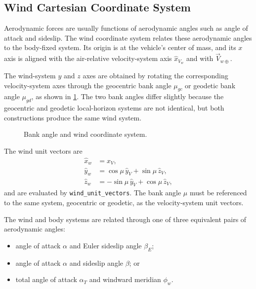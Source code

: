 \subsection{Wind Cartesian Coordinate System}\label{sec:wind-coordinate}

Aerodynamic forces are usually functions of aerodynamic angles such as angle of
attack and sideslip. The wind coordinate system relates these aerodynamic angles to
the body-fixed system. Its origin is at the vehicle's center of mass, and its $x$ axis
is aligned with the air-relative velocity-system axis $\hat x_{V_w}$ and with
$\vec V_{w\oplus}$.

The wind-system $y$ and $z$ axes are obtained by rotating the corresponding
velocity-system axes through the geocentric bank angle $\mu_{gc}$ or geodetic bank
angle $\mu_{gd}$, as shown in \cref{fig:bank-angle-wind-system}. The two bank
angles differ slightly because the geocentric and geodetic local-horizon systems are
not identical, but both constructions produce the same wind system.

\begin{figure}[htbp]
  \centering
  \resizebox{0.76\linewidth}{!}{}
  \caption{Bank angle and wind coordinate system.}
  \label{fig:bank-angle-wind-system}
\end{figure}

The wind unit vectors are
\begin{equation}
  \begin{aligned}
    \hat x_w &= \hat x_V,\\
    \hat y_w &= \cos\mu\,\hat y_V+\sin\mu\,\hat z_V,\\
    \hat z_w &= -\sin\mu\,\hat y_V+\cos\mu\,\hat z_V,
  \end{aligned}
  \label{eq:wind-unit-vectors}
\end{equation}
and are evaluated by \texttt{wind\_unit\_vectors}. The bank angle $\mu$ must be
referenced to the same system, geocentric or geodetic, as the velocity-system unit
vectors.

The wind and body systems are related through one of three equivalent pairs of
aerodynamic angles:
\begin{itemize}[leftmargin=1.6em]
  \item angle of attack $\alpha$ and Euler sideslip angle $\beta_E$;
  \item angle of attack $\alpha$ and sideslip angle $\beta$; or
  \item total angle of attack $\alpha_T$ and windward meridian $\phi_w$.
\end{itemize}

